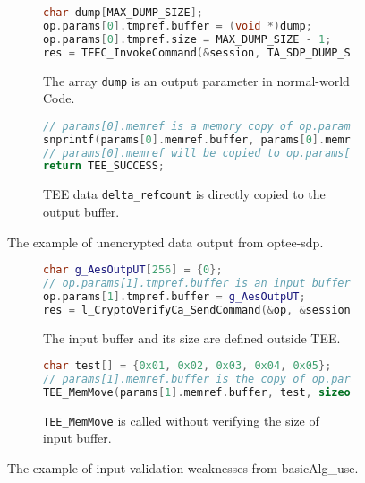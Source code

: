 \begin{figure}[t]
  \centering
  \begin{subfigure}[b]{\linewidth}
    \begin{lstlisting}[language=c++]
char dump[MAX_DUMP_SIZE];
op.params[0].tmpref.buffer = (void *)dump;
op.params[0].tmpref.size = MAX_DUMP_SIZE - 1;
res = TEEC_InvokeCommand(&session, TA_SDP_DUMP_STATUS, &op, &err_origin);
    \end{lstlisting}
    \caption{The array \texttt{dump} is an output parameter in normal-world Code.}
  \end{subfigure}
  \hfill
  \begin{subfigure}[b]{\linewidth}
        \begin{lstlisting}[language=c++]
// params[0].memref is a memory copy of op.params[0].tmpref in the normal world
snprintf(params[0].memref.buffer, params[0].memref.size, "delta (decoder) refcount %d\n", delta_refcount);
// params[0].memref will be copied to op.params[0].tmpref after return
return TEE_SUCCESS;
    \end{lstlisting}
    \caption{TEE data \texttt{delta\_refcount} is directly copied to the output buffer.}
  \end{subfigure}
  \caption{The example of unencrypted data output from optee-sdp.}
  \label{fig:bp1code}
\end{figure}

\begin{figure}[t]
  \centering
  \begin{subfigure}[b]{\linewidth}
    \begin{lstlisting}[language=c++]
char g_AesOutpUT[256] = {0};
// op.params[1].tmpref.buffer is an input buffer larger than test buffer in TEE
op.params[1].tmpref.buffer = g_AesOutpUT;
res = l_CryptoVerifyCa_SendCommand(&op, &session, CMD_AES_OPER);
    \end{lstlisting}
    \caption{The input buffer and its size are defined outside TEE.}
  \end{subfigure}
  \hfill
  \begin{subfigure}[b]{\linewidth}
        \begin{lstlisting}[language=c++]
char test[] = {0x01, 0x02, 0x03, 0x04, 0x05};
// params[1].memref.buffer is the copy of op.params[1].tmpref.buffer in the normal world
TEE_MemMove(params[1].memref.buffer, test, sizeof(test));
    \end{lstlisting}
    \caption{\texttt{TEE\_MemMove} is called without verifying the size of input buffer.}
  \end{subfigure}
  \caption{The example of input validation weaknesses from basicAlg\_use.}
  \label{fig:bp2code}
\end{figure}

